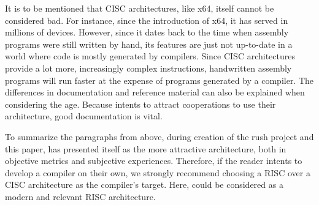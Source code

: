 It is to be mentioned that CISC architectures, like x64, itself cannot be considered bad.
For instance, since the introduction of x64, it has served in millions of devices.
However, since it dates back to the time when assembly programs were still written by hand,
its features are just not up-to-date in a world where code is mostly generated by compilers.
Since CISC architectures provide a lot more, increasingly complex instructions,
handwritten assembly programs will run faster at the expense of programs generated by a compiler.
The differences in documentation and reference material can also be explained when considering the age.
Because \riscv{} intents to attract cooperations to use their architecture, good documentation is vital.

To summarize the paragraphs from above,
during creation of the rush project and this paper,
\riscv{} has presented itself as the more attractive architecture,
both in objective metrics and subjective experiences.
Therefore, if the reader intents to develop a compiler on their own,
we strongly recommend choosing a RISC over a CISC architecture as the compiler's target.
Here, \riscv{} could be considered as a modern and relevant RISC architecture.

